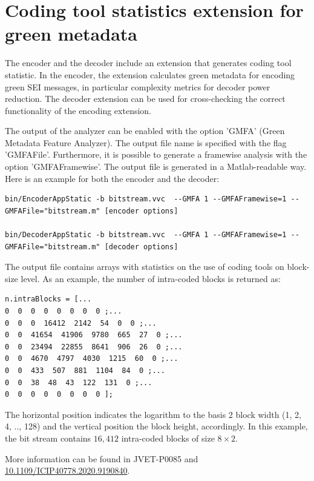 \documentclass[a4paper,11pt]{jvetdoc}
\begin{document}
\section{Coding tool statistics extension for green metadata}
\label{sec:green-meta-sei}

The encoder and the decoder include an extension that generates coding tool statistic. In the encoder, the extension calculates green metadata for encoding green SEI messages, in particular complexity metrics for decoder power reduction. The decoder extension can be used for cross-checking the correct functionality of the encoding extension.

The output of the analyzer can be enabled with the option 'GMFA' (Green Metadata Feature Analyzer). The output file name is specified with the flag 'GMFAFile'.
Furthermore, it is possible to generate a framewise analysis with the option 'GMFAFramewise'. The output file is generated in a Matlab-readable way. Here is an example for both the encoder and the decoder:

\begin{verbatim}
bin/EncoderAppStatic -b bitstream.vvc  --GMFA 1 --GMFAFramewise=1 --GMFAFile="bitstream.m" [encoder options]

bin/DecoderAppStatic -b bitstream.vvc  --GMFA 1 --GMFAFramewise=1 --GMFAFile="bitstream.m" [decoder options]
\end{verbatim}

The output file contains arrays with statistics on the use of coding tools on block-size level. As an example, the number of intra-coded blocks is returned as:

\begin{verbatim}
n.intraBlocks = [...
0  0  0  0  0  0  0  0 ;...
0  0  0  16412  2142  54  0  0 ;...
0  0  41654  41906  9780  665  27  0 ;...
0  0  23494  22855  8641  906  26  0 ;...
0  0  4670  4797  4030  1215  60  0 ;...
0  0  433  507  881  1104  84  0 ;...
0  0  38  48  43  122  131  0 ;...
0  0  0  0  0  0  0  0 ];
\end{verbatim}

The horizontal position indicates the logarithm to the basis 2 block width (1, 2, 4, .., 128) and the vertical position the block height, accordingly. In this example, the bit stream contains $16{,}412$ intra-coded blocks of size $8\times 2$.

More information can be found in JVET-P0085 and \url{10.1109/ICIP40778.2020.9190840}.
\end{document}
